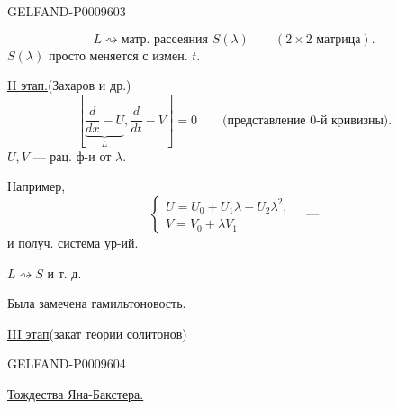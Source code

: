 \begin{GelfandAdjacentEvidence}{GELFAND-P000960}{3}

\begin{equation*}
 L\rightsquigarrow\text{матр. рассеяния }S(\lambda)\qquad(2\times2\text{ матрица}).\tag{4}
\end{equation*}
$S(\lambda)$ просто меняется с измен. $t$.

\underline{II этап.}\quad (Захаров и др.)
\begin{equation*}
 \left[\underbrace{\frac{d}{dx}-U}_{L},\frac{d}{dt}-V\right]=0
 \qquad\text{(представление 0-й кривизны)}.\tag{5}
\end{equation*}
$U,V$ --- рац. ф-и от $\lambda$.

Например,
\begin{equation*}
 \begin{cases}
 U=U_0+U_1\lambda+U_2\lambda^2,\\
 V=V_0+\lambda V_1
 \end{cases}\quad\text{---}\tag{6}
\end{equation*}
и получ. система ур-ий.

$L\rightsquigarrow S$ и т. д.

Была замечена гамильтоновость.

\underline{III этап}\quad (закат теории солитонов)
\end{GelfandAdjacentEvidence}
\begin{GelfandAdjacentEvidence}{GELFAND-P000960}{4}


\underline{Тождества Яна-Бакстера.}
\end{GelfandAdjacentEvidence}
